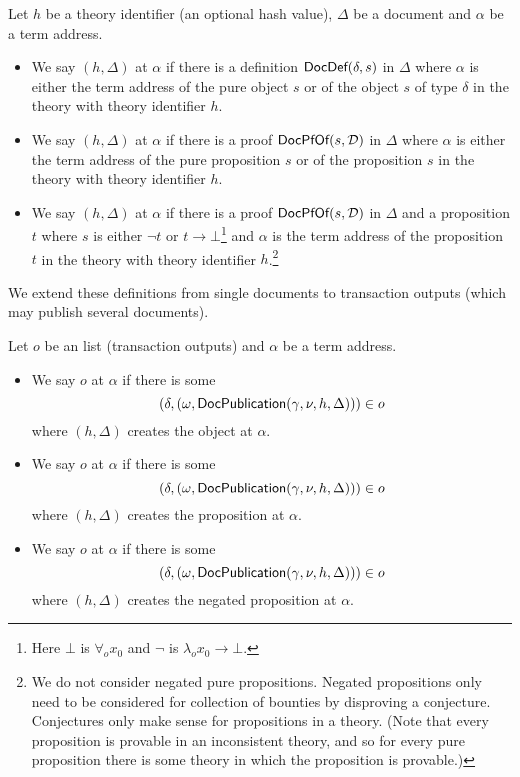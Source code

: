 Let $h$ be a theory identifier (an optional hash value),
$\Delta$ be a document
and $\alpha$ be a term address.
\begin{itemize}
\item We say $(h,\Delta)$ {} at $\alpha$ if
      there is a definition ${\constr{DocDef}}(\delta,s)$ in $\Delta$
      where $\alpha$ is either the term address of the pure object $s$ or
      of the object $s$ of type $\delta$ in the theory with theory identifier $h$.
\item We say $(h,\Delta)$ {} at $\alpha$ if
      there is a proof ${\constr{DocPfOf}}(s,\cD)$ in $\Delta$
      where $\alpha$ is either the term address of the pure proposition $s$ or
      of the proposition $s$ in the theory with theory identifier $h$.
\item We say $(h,\Delta)$ {} at $\alpha$ if
      there is a proof ${\constr{DocPfOf}}(s,\cD)$ in $\Delta$
      and a proposition $t$ where $s$ is either $\neg t$ or $t\to\bot$\footnote{Here $\bot$ is $\forall_o x_0$ and $\neg$ is $\lambda_o x_0\to\bot$.}
      and
      $\alpha$ is the term address 
      of the proposition $t$ in the theory with theory identifier $h$.\footnote{We do not consider negated pure propositions. Negated propositions only need to be considered for collection of bounties by disproving a conjecture. Conjectures only make sense for propositions in a theory. (Note that every proposition is provable in an inconsistent theory, and so for every pure proposition there is some theory in which the proposition is provable.)}
\end{itemize}

We extend these definitions from single documents to transaction outputs (which
may publish several documents).

Let $o$ be an {} list (transaction outputs)
and $\alpha$ be a term address.
\begin{itemize}
\item We say $o$ {} at $\alpha$
if there is some 
$$(\delta,(\omega,{\constr{DocPublication}}(\gamma,\nu,h,\Delta)))\in o$$
where $(h,\Delta)$ creates the object at $\alpha$.
\item We say $o$ {} at $\alpha$
if there is some 
$$(\delta,(\omega,{\constr{DocPublication}}(\gamma,\nu,h,\Delta)))\in o$$
where $(h,\Delta)$ creates the proposition at $\alpha$.
\item We say $o$ {} at $\alpha$
if there is some 
$$(\delta,(\omega,{\constr{DocPublication}}(\gamma,\nu,h,\Delta)))\in o$$
where $(h,\Delta)$ creates the negated proposition at $\alpha$.
\end{itemize}

